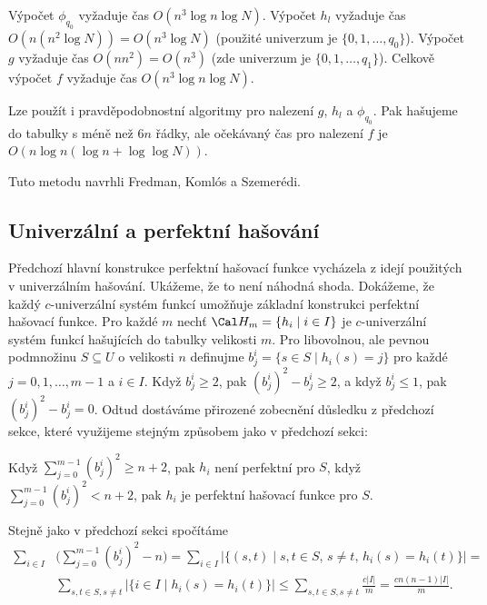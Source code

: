 \documentclass[a4paper,12pt]{article}
\begin{document}
Výpočet $\phi_{q_0}$ vyžaduje čas $O(n^3\log 
n\log N)$. Výpočet $h_l$ 
vyža\-du\-je čas $O(n(n^2\log N))=O(n^3\log N)$ (použité univerzum je 
$\{0,1,\dots,q_0\}$). Výpočet $g$ vyžaduje čas $O(nn^2
)=O(n^3)$ 
(zde univerzum je $\{0,1,\dots,q_1\}$). Celkově 
výpočet $f$ vyžaduje čas $O(n^3\log n\log N)$.

Lze použít i pravděpodobnostní algoritmy pro nalezení 
$g$, $h_l$ a $\phi_{q_0}$. Pak hašujeme do tabulky s méně než $
6n$ 
řádky, ale očekávaný čas pro nalezení $f$ je 
$O(n\log n(\log n+\log\log N))$.


Tuto metodu navrhli Fredman, Koml\'os a Szemerédi.

\subsection{
Univerzální a perfektní hašování
}

Předchozí hlavní konstrukce perfektní hašovací funkce 
vycházela z idejí použitých v univerzálním hašování.  Ukážeme, 
že to není náhodná shoda. Dokážeme, že každý $
c$-univerzální 
systém funkcí umožňuje základní konstrukci perfektní hašovací 
funkce.  Pro každé $m$ nechť $\Cal H_m=\{h_i\mid i\in I\}$ je $
c$-univerzální 
systém funkcí hašujících do ta\-bulky velikosti $
m$. Pro 
libovolnou, ale pevnou podmnožinu $S\subseteq U$ o velikosti $
n$ definujme 
$b_j^i=\{s\in S\mid h_i(s)=j\}$ pro každé $j=0,1,\dots,m-1$ a $
i\in I$. Když 
$b^i_j\ge 2$, pak $(b^i_j)^2-b^i_j\ge 2$, a když $b^i_j\le 1$, pak $
(b^i_j)^2-b^i_j=0$. Odtud 
dostáváme přirozené zobecnění důsledku z předchozí 
sekce, které využijeme stejným způsobem jako v 
předchozí sekci:

\begin{dusledek}Když $\sum_{j=0}^{m-1}(b^i_j)^2\ge n+2$, pak $h_i$ není 
perfektní pro $S$, když $\sum_{j=0}^{m-1}(b^i_j)^2<n+2$, pak $h_i$ je perfektní 
hašovací funkce pro $S$.
\end{dusledek}

Stejně jako v předchozí sekci spočítáme  
\begin{align*}\sum_{i\in I}&\big(\sum_{j=0}^{m-1}(b^i_j)^2-n\big)=\sum_{
i\in I}|\{(s,t)\mid s,t\in S,\,s\ne t,\,h_i(s)=h_i(t)\}|=\\
&\sum_{s,t\in S,s\ne t}|\{i\in I\mid h_i(s)=h_i(t)\}|\le\sum_{s,t
\in S,s\ne t}\frac {c|I|}m=\frac {cn(n-1)|I|}m.\end{align*}
\end{document}
